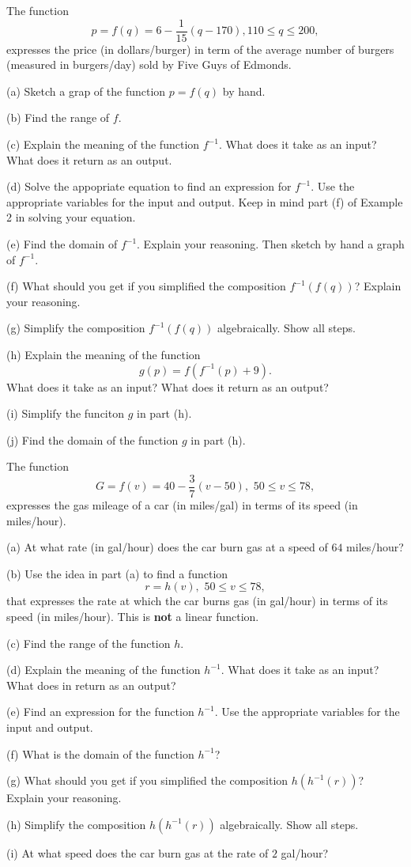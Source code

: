 \documentclass{ximera}
\begin{document}
\begin{example}  \label{Ex3:Inverse}
The function
\[
    p = f(q) = 6 - \frac{1}{15} \left(  q- 170 \right) , 110 \leq q \leq 200 ,
\]
expresses the price (in dollars/burger) in term of the average number of burgers (measured in burgers/day) sold by Five Guys of Edmonds.

(a) Sketch a grap of the function $p=f(q)$ by hand.

(b) Find the range of $f$.

(c) Explain the meaning of the function $f^{-1}$. What does it take as an input? What does it return as an output.

(d) Solve the appopriate equation to find an expression for $f^{-1}$. Use the appropriate variables for the input and output. Keep in mind part (f) of Example 2 in solving your equation.

(e) Find the domain of $f^{-1}$. Explain your reasoning. Then sketch by hand a graph of $f^{-1}$.

(f) What should you get if you simplified the composition $f^{-1}(f(q))$? Explain your reasoning.

(g) Simplify the composition $f^{-1}(f(q))$ algebraically. Show all steps.

(h) Explain the meaning of the function 
\[
   g(p) = f(f^{-1}(p)+9).
\]
What does it take as an input? What does it return as an output?

(i) Simplify the funciton $g$ in part (h).

(j) Find the domain of the function $g$ in part (h).


\end{example}


\begin{example} \label{Ex4:Inverses}
The function 
\[
    G = f(v) = 40-\frac{3}{7}(v-50) ,  \,\, 50\leq v \leq 78 ,
\]
expresses the gas mileage of a car (in miles/gal) in terms of its speed (in miles/hour).

(a) At what rate (in gal/hour) does the car burn gas at a speed of $64$ miles/hour?

(b) Use the idea in part (a) to find a function 
\[
     r=h(v) , \,\, 50\leq v \leq 78 ,
\]
that expresses the rate at which the car burns gas (in gal/hour) in terms of its speed (in miles/hour). This is {\bf not} a linear function.

(c) Find the range of the function $h$.

(d) Explain the meaning of the function $h^{-1}$. What does it take as an input? What does in return as an output?

(e) Find an expression for the function $h^{-1}$. Use the appropriate variables for the input and output.

(f) What is the domain of the function $h^{-1}$?

(g) What should you get if you simplified the composition $h(h^{-1}(r))$? Explain your reasoning.

(h) Simplify the composition $h(h^{-1}(r))$ algebraically. Show all steps.

(i) At what speed does the car burn gas at the rate of $2$ gal/hour?

\end{example}
\end{document}
